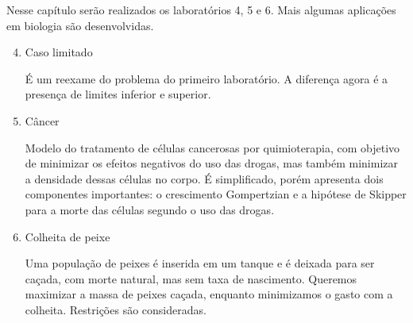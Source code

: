 Nesse capítulo serão realizados os laboratórios 4, 5 e 6. Mais algumas
aplicações em biologia são desenvolvidas.

\begin{enumerate}[label=\textbf{Lab \arabic*:}]
    \setcounter{enumi}{3}

    \item Caso limitado 
    
    É um reexame do problema do primeiro laboratório. A diferença agora é a
    presença de limites inferior e superior. 

    \item Câncer
    
    Modelo do tratamento de células cancerosas por quimioterapia, com objetivo
    de minimizar os efeitos negativos do uso das drogas, mas também minimizar
    a densidade dessas células no corpo. É simplificado, porém apresenta dois
    componentes importantes: o crescimento Gompertzian e a hipótese de Skipper
    para a morte das células segundo o uso das drogas. 

    \item Colheita de peixe  
    
    Uma população de peixes é inserida em um tanque e é deixada para ser
    caçada, com morte natural, mas sem taxa de nascimento. Queremos maximizar
    a massa de peixes caçada, enquanto minimizamos o gasto com a colheita.
    Restrições são consideradas. 
 
\end{enumerate}